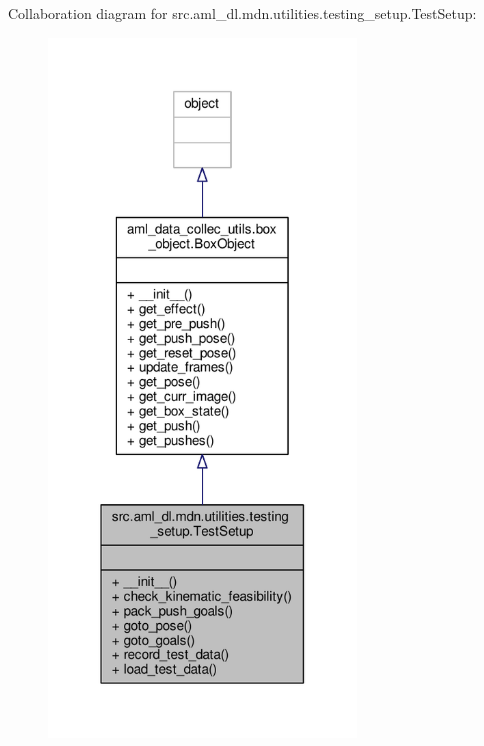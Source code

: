 Collaboration diagram for src.\-aml\-\_\-dl.\-mdn.\-utilities.\-testing\-\_\-setup.\-Test\-Setup\-:
\nopagebreak
\begin{figure}[H]
\begin{center}
\leavevmode
\includegraphics[width=232pt]{classsrc_1_1aml__dl_1_1mdn_1_1utilities_1_1testing__setup_1_1_test_setup__coll__graph}
\end{center}
\end{figure}

